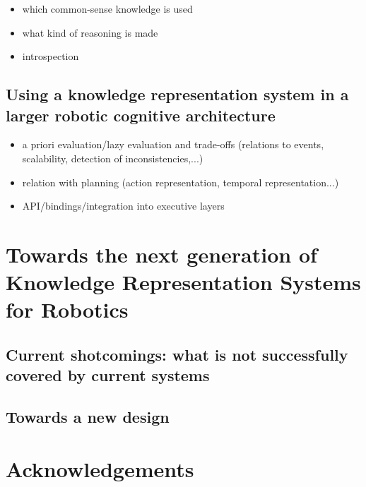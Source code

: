 \documentclass[a4paper, twocolumn]{article}
\begin{document}
\begin{itemize}
	\item which common-sense knowledge is used
	\item what kind of reasoning is made
	\item introspection
\end{itemize}


\subsection{Using a knowledge representation system in a larger robotic cognitive architecture}
\label{sect|summary-integration}

\begin{itemize}
	\item a priori evaluation/lazy evaluation and trade-offs (relations to events, scalability, detection of inconsistencies,...)
	\item relation with planning (action representation, temporal representation...)
	\item API/bindings/integration into executive layers
\end{itemize}

\section{Towards the next generation of Knowledge Representation Systems for Robotics}
\label{sect|conclusion}

\subsection{Current shotcomings: what is not successfully covered by current systems}

\subsection{Towards a new design}

\section*{Acknowledgements} 




\end{document}
